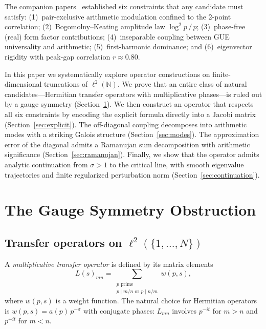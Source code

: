 \documentclass[11pt,a4paper]{article}
\begin{document}
The companion papers~\cite{Paper1,Paper2} established six constraints that any candidate must satisfy:
(1)~pair-exclusive arithmetic modulation confined to the 2-point correlation;
(2)~Bogomolny--Keating amplitude law $\log^2 p\,/\,p$;
(3)~phase-free (real) form factor contributions;
(4)~inseparable coupling between GUE universality and arithmetic;
(5)~first-harmonic dominance; and
(6)~eigenvector rigidity with peak-gap correlation $r \approx 0.80$.

In this paper we systematically explore operator constructions on finite-dimensional truncations of $\ell^2(\mathbb{N})$.
We prove that an entire class of natural candidates---Hermitian transfer operators with multiplicative phases---is ruled out by a gauge symmetry (Section~\ref{sec:gauge}).
We then construct an operator that respects all six constraints by encoding the explicit formula directly into a Jacobi matrix (Section~\ref{sec:explicit}).
The off-diagonal coupling decomposes into arithmetic modes with a striking Galois structure (Section~\ref{sec:modes}).
The approximation error of the diagonal admits a Ramanujan sum decomposition with arithmetic significance (Section~\ref{sec:ramanujan}).
Finally, we show that the operator admits analytic continuation from $\sigma > 1$ to the critical line, with smooth eigenvalue trajectories and finite regularized perturbation norm (Section~\ref{sec:continuation}).

\section{The Gauge Symmetry Obstruction}\label{sec:gauge}

\subsection{Transfer operators on $\ell^2(\{1,\ldots,N\})$}

A \emph{multiplicative transfer operator} is defined by its matrix elements
\begin{equation}\label{eq:transfer}
L(s)_{mn} = \sum_{\substack{p \text{ prime} \\ p \mid m/n \text{ or } p \mid n/m}} w(p,s),
\end{equation}
where $w(p,s)$ is a weight function.
The natural choice for Hermitian operators is $w(p,s) = a(p)\,p^{-\sigma}$ with conjugate phases: $L_{mn}$ involves $p^{-it}$ for $m > n$ and $p^{+it}$ for $m < n$.
\end{document}
